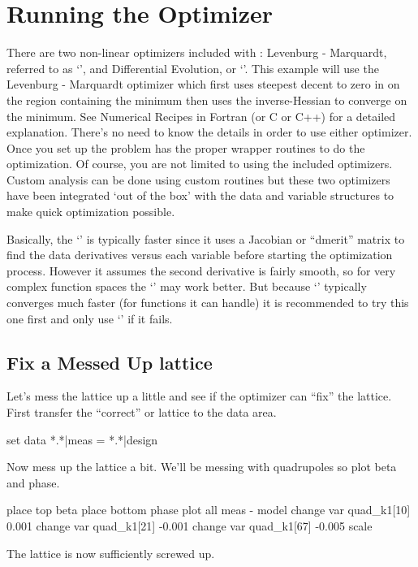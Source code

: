 \section{Running the Optimizer}
\label{s:optimizer}

There are two non-linear optimizers included with \tao: Levenburg -
Marquardt, referred to as `', and Differential Evolution, or
`'. This example will use the Levenburg - Marquardt optimizer
which first uses steepest decent to zero in on the region containing
the minimum then uses the inverse-Hessian to converge on the
minimum. See Numerical Recipes in Fortran (or C or C++) for a detailed
explanation. There's no need to know the details in order to use
either optimizer. Once you set up the problem \tao has the proper
wrapper routines to do the optimization. Of course, you are not
limited to using the included optimizers. Custom analysis can be done
using custom routines but these two optimizers have been integrated
`out of the box' with the \tao data and variable structures to make
quick optimization possible.

Basically, the `' is typically faster since it uses a Jacobian
or ``dmerit'' matrix to find the data derivatives versus each variable
before starting the optimization process.  However it assumes the
second derivative is fairly smooth, so for very complex function
spaces the `' may work better. But because `' typically
converges much faster (for functions it can handle) it is recommended
to try this one first and only use `' if it fails.

\subsection{Fix a Messed Up lattice}
\label{ss:fix_it}

Let's mess the lattice up a little and see if the optimizer can
``fix'' the lattice. First transfer the ``correct'' or 
lattice to the  data area.
\begin{example}
  set data *.*|meas = *.*|design
\end{example}
Now mess up the lattice a bit. We'll be messing with quadrupoles so
plot beta and phase.
\begin{example}
  place top beta
  place bottom phase
  plot all meas - model
  change var quad\_k1[10] 0.001
  change var quad\_k1[21] -0.001
  change var quad\_k1[67] -0.005
  scale
\end{example}
The lattice is now sufficiently screwed up.

